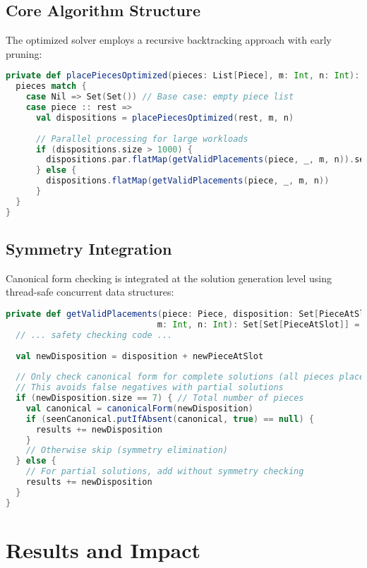 \documentclass[12pt,a4paper]{article}
\theoremstyle{definition}
\begin{document}
\subsection{Core Algorithm Structure}

The optimized solver employs a recursive backtracking approach with early pruning:

\begin{lstlisting}[language=Scala, caption=Core Solver Logic]
private def placePiecesOptimized(pieces: List[Piece], m: Int, n: Int): Solutions = {
  pieces match {
    case Nil => Set(Set()) // Base case: empty piece list
    case piece :: rest =>
      val dispositions = placePiecesOptimized(rest, m, n)
      
      // Parallel processing for large workloads
      if (dispositions.size > 1000) {
        dispositions.par.flatMap(getValidPlacements(piece, _, m, n)).seq.toSet
      } else {
        dispositions.flatMap(getValidPlacements(piece, _, m, n))
      }
  }
}
\end{lstlisting}

\subsection{Symmetry Integration}

Canonical form checking is integrated at the solution generation level using thread-safe concurrent data structures:

\begin{lstlisting}[language=Scala, caption=Symmetry-Aware Placement]
private def getValidPlacements(piece: Piece, disposition: Set[PieceAtSlot], 
                              m: Int, n: Int): Set[Set[PieceAtSlot]] = {
  // ... safety checking code ...
  
  val newDisposition = disposition + newPieceAtSlot
  
  // Only check canonical form for complete solutions (all pieces placed)
  // This avoids false negatives with partial solutions
  if (newDisposition.size == 7) { // Total number of pieces
    val canonical = canonicalForm(newDisposition)
    if (seenCanonical.putIfAbsent(canonical, true) == null) {
      results += newDisposition
    }
    // Otherwise skip (symmetry elimination)
  } else {
    // For partial solutions, add without symmetry checking
    results += newDisposition
  }
}
\end{lstlisting}

\section{Results and Impact}
\end{document}
